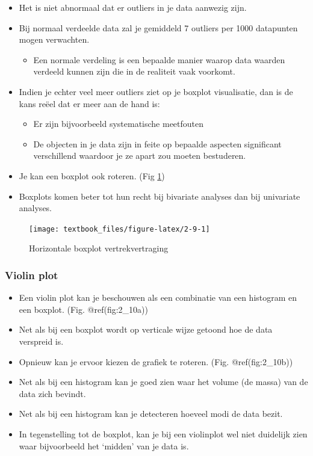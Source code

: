 \documentclass[]{tufte-book}
\providecommand{\tightlist}{%
  \setlength{\itemsep}{0pt}\setlength{\parskip}{0pt}}
\begin{document}
\begin{itemize}
\tightlist
\item
  Het is niet abnormaal dat er outliers in je data aanwezig zijn.
\item
  Bij normaal verdeelde data zal je gemiddeld 7 outliers per 1000 datapunten mogen verwachten.

  \begin{itemize}
  \tightlist
  \item
    Een normale verdeling is een bepaalde manier waarop data waarden verdeeld kunnen zijn die in de realiteit vaak voorkomt.
  \end{itemize}
\item
  Indien je echter veel meer outliers ziet op je boxplot visualisatie, dan is de kans reëel dat er meer aan de hand is:

  \begin{itemize}
  \tightlist
  \item
    Er zijn bijvoorbeeld systematische meetfouten
  \item
    De objecten in je data zijn in feite op bepaalde aspecten significant verschillend waardoor je ze apart zou moeten bestuderen.
  \end{itemize}
\item
  Je kan een boxplot ook roteren. (Fig \ref{fig:2-9})
\item
  Boxplots komen beter tot hun recht bij bivariate analyses dan bij univariate analyses.
\end{itemize}

\begin{figure}
\texttt{[image: textbook\_files/figure-latex/2-9-1]} \caption[Horizontale boxplot vertrekvertraging]{Horizontale boxplot vertrekvertraging}\label{fig:2-9}
\end{figure}

\hypertarget{violin-plot}{%
\subsubsection{Violin plot}\label{violin-plot}}

\begin{itemize}
\tightlist
\item
  Een violin plot kan je beschouwen als een combinatie van een histogram en een boxplot. (Fig. @ref(fig:2\_10a))
\item
  Net als bij een boxplot wordt op verticale wijze getoond hoe de data verspreid is.
\item
  Opnieuw kan je ervoor kiezen de grafiek te roteren. (Fig. @ref(fig:2\_10b))
\item
  Net als bij een histogram kan je goed zien waar het volume (de massa) van de data zich bevindt.
\item
  Net als bij een histogram kan je detecteren hoeveel modi de data bezit.
\item
  In tegenstelling tot de boxplot, kan je bij een violinplot wel niet duidelijk zien waar bijvoorbeeld het `midden' van je data is.
\end{itemize}
\end{document}
